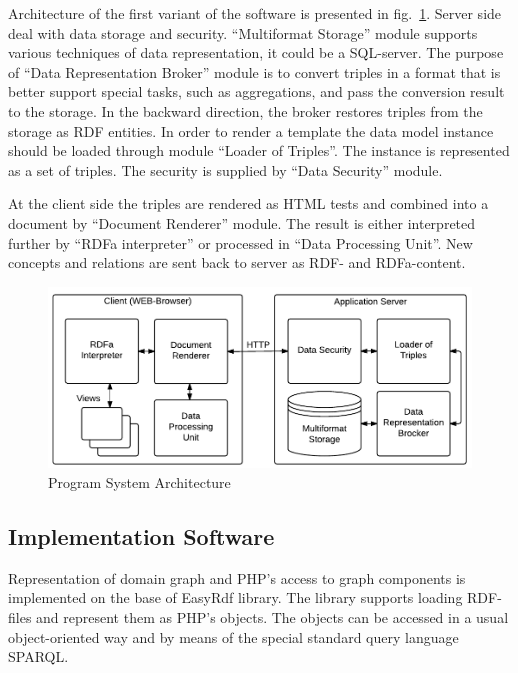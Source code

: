 \documentclass[conference]{IEEEtran}
\begin{document}
Architecture of the first variant of the software is presented in
fig.~\ref{fig:progsys}.  Server side deal with data storage and
security.  ``Multiformat Storage'' module supports various techniques
of data representation, it could be a SQL-server.  The purpose of
``Data Representation Broker'' module is to convert triples in a
format that is better support special tasks, such as aggregations, and
pass the conversion result to the storage.  In the backward direction,
the broker restores triples from the storage as RDF entities.  In
order to render a template the data model instance should be loaded
through module ``Loader of Triples''.  The instance is represented as
a set of triples.  The security is supplied by “Data Security” module.

At the client side the triples are rendered as HTML tests and combined
into a document by ``Document Renderer'' module.  The result is either
interpreted further by ``RDFa interpreter'' or processed in ``Data
Processing Unit''.  New concepts and relations are sent back to server
as RDF- and RDFa-content.

\noindent\begin{figure}[!t]
\centering
\includegraphics[width=\linewidth]{peixe-architecture-en-2.pdf}
\caption{Program System Architecture}
\label{fig:progsys}
\end{figure}

\subsection{Implementation Software}
\label{sec:implsoft}

Representation of domain graph and PHP's access to graph components is
implemented on the base of EasyRdf library.  The library supports
loading RDF-files and represent them as PHP's objects.  The objects
can be accessed in a usual object-oriented way and by means of the
special standard query language SPARQL.
\end{document}
